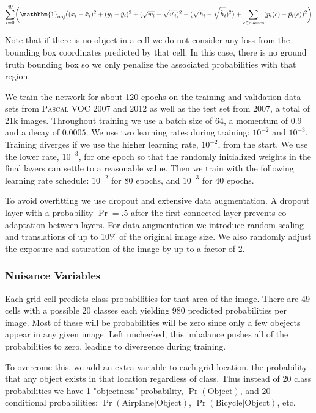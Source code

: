 \documentclass{article} %
\begin{document}
\begin{equation}
\sum_{i = 0}^{49} \biggl( \mathbbm{1}_{\text{obj}}\bigl((x_i - \hat{x}_i)^2 + (y_i - \hat{y}_i)^2 + (\sqrt{w_i} - \sqrt{\hat{w}_i})^2 + (\sqrt{h_i} - \sqrt{\hat{h}_i})^2\bigr) + \sum_{c \in \text{classes}} (p_i(c) - \hat{p}_i(c))^2 \biggr)
\end{equation}

Note that if there is no object in a cell we do not consider any loss from the bounding box coordinates predicted by that cell. In this case, there is no ground truth bounding box so we only penalize the associated probabilities with that region.

We train the network for about 120 epochs on the training and validation data sets from \textsc{Pascal} VOC 2007 and 2012 as well as the test set from 2007, a total of 21k images. Throughout training we use a batch size of 64, a momentum of $0.9$ and a decay of $0.0005$. We use two learning rates during training: $10^{-2}$ and $10^{-3}$. Training diverges if we use the higher learning rate, $10^{-2}$, from the start. We use the lower rate, $10^{-3}$, for one epoch so that the randomly initialized weights in the final layers can settle to a reasonable value. Then we train with the following learning rate schedule: $10^{-2}$ for 80 epochs, and $10^{-3}$ for 40 epochs.

To avoid overfitting we use dropout and extensive data augmentation. A dropout layer with a probability $\Pr = .5$ after the first connected layer prevents co-adaptation between layers. For data augmentation we introduce random scaling and translations of up to 10\% of the original image size. We also randomly adjust the exposure and saturation of the image by up to a factor of 2.

\subsubsection{Nuisance Variables}

Each grid cell predicts class probabilities for that area of the image. There are 49 cells with a possible 20 classes each yielding 980 predicted probabilities per image. Most of these will be probabilities will be zero since only a few obejects appear in any given image. Left unchecked, this imbalance pushes all of the probabilities to zero, leading to divergence during training.

To overcome this, we add an extra variable to each grid location, the probability that any object exists in that location regardless of class. Thus instead of 20 class probabilities we have 1 "objectness" probability, $\Pr(\textrm{Object})$, and 20 conditional probabilities: $\Pr(\textrm{Airplane} | \textrm{Object})$, $\Pr(\textrm{Bicycle} | \textrm{Object})$, etc.
\end{document}

